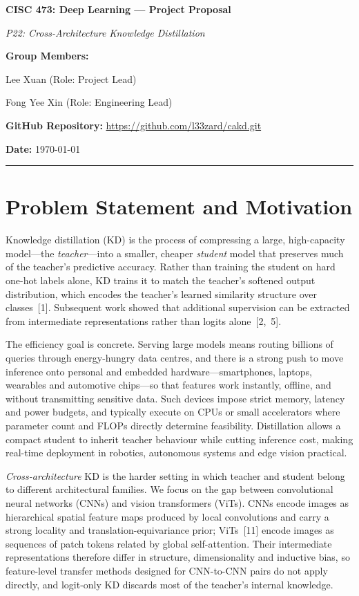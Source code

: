 \documentclass[11pt, letterpaper]{article}
\begin{document}
{\centering
  {\Large\textbf{CISC 473: Deep Learning --- Project Proposal}}\par\vspace{0.5em}
  {\large\textit{P22: Cross-Architecture Knowledge Distillation}}\par\vspace{0.4em}
  \textbf{Group Members:}\par
  Lee Xuan  \quad (Role: Project Lead)\par
  Fong Yee Xin  \quad (Role: Engineering Lead)\par
  \textbf{GitHub Repository:} \url{https://github.com/l33zard/cakd.git}\par\vspace{0.3em}
  \textbf{Date:} \today\par\vspace{0.4em}
  \rule{\linewidth}{0.4pt}
}

\section{Problem Statement and Motivation}

Knowledge distillation (KD) is the process of compressing a large, high-capacity
model---the \emph{teacher}---into a smaller, cheaper \emph{student} model that
preserves much of the teacher's predictive accuracy. Rather than training the
student on hard one-hot labels alone, KD trains it to match the teacher's
softened output distribution, which encodes the teacher's learned similarity
structure over classes~[1]. Subsequent work showed that additional supervision
can be extracted from intermediate representations rather than logits
alone~[2,~5].

The efficiency goal is concrete. Serving large models means routing billions of
queries through energy-hungry data centres, and there is a strong push to move
inference onto personal and embedded hardware---smartphones, laptops, wearables
and automotive chips---so that features work instantly, offline, and without
transmitting sensitive data. Such devices impose strict memory, latency and
power budgets, and typically execute on CPUs or small accelerators where
parameter count and FLOPs directly determine feasibility. Distillation allows a
compact student to inherit teacher behaviour while cutting inference cost,
making real-time deployment in robotics, autonomous systems and edge vision
practical.

\emph{Cross-architecture} KD is the harder setting in which teacher and student
belong to different architectural families. We focus on the gap between
convolutional neural networks (CNNs) and vision transformers (ViTs). CNNs encode
images as hierarchical spatial feature maps produced by local convolutions and
carry a strong locality and translation-equivariance prior; ViTs~[11] encode images
as sequences of patch tokens related by global self-attention. Their intermediate
representations therefore differ in structure, dimensionality and inductive
bias, so feature-level transfer methods designed for CNN-to-CNN pairs do not
apply directly, and logit-only KD discards most of the teacher's internal
knowledge.
\end{document}
